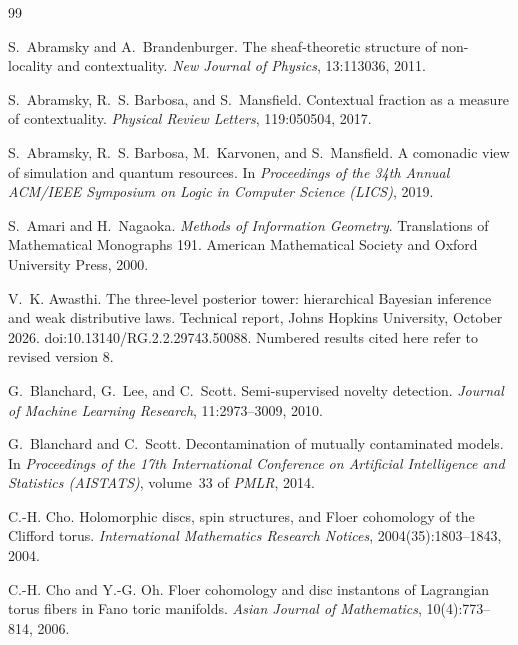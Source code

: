 \documentclass[11pt]{article}
\theoremstyle{definition}
\theoremstyle{remark}
\begin{document}
\begin{thebibliography}{99}

S.~Abramsky and A.~Brandenburger.
\newblock The sheaf-theoretic structure of non-locality and contextuality.
\newblock \emph{New Journal of Physics}, 13:113036, 2011.

S.~Abramsky, R.~S. Barbosa, and S.~Mansfield.
\newblock Contextual fraction as a measure of contextuality.
\newblock \emph{Physical Review Letters}, 119:050504, 2017.

S.~Abramsky, R.~S. Barbosa, M.~Karvonen, and S.~Mansfield.
\newblock A comonadic view of simulation and quantum resources.
\newblock In \emph{Proceedings of the 34th Annual ACM/IEEE Symposium on Logic in Computer Science
  (LICS)}, 2019.

S.~Amari and H.~Nagaoka.
\newblock \emph{Methods of Information Geometry}.
\newblock Translations of Mathematical Monographs 191. American Mathematical Society and Oxford
University Press, 2000.

V.~K. Awasthi.
\newblock The three-level posterior tower: hierarchical Bayesian inference and weak distributive laws.
\newblock Technical report, Johns Hopkins University, October 2026.
\newblock doi:10.13140/RG.2.2.29743.50088. Numbered results cited here refer to revised version 8.

G.~Blanchard, G.~Lee, and C.~Scott.
\newblock Semi-supervised novelty detection.
\newblock \emph{Journal of Machine Learning Research}, 11:2973--3009, 2010.

G.~Blanchard and C.~Scott.
\newblock Decontamination of mutually contaminated models.
\newblock In \emph{Proceedings of the 17th International Conference on Artificial Intelligence and
  Statistics (AISTATS)}, volume~33 of \emph{PMLR}, 2014.

C.-H. Cho.
\newblock Holomorphic discs, spin structures, and {F}loer cohomology of the {C}lifford torus.
\newblock \emph{International Mathematics Research Notices}, 2004(35):1803--1843, 2004.

C.-H. Cho and Y.-G. Oh.
\newblock Floer cohomology and disc instantons of {L}agrangian torus fibers in {F}ano toric manifolds.
\newblock \emph{Asian Journal of Mathematics}, 10(4):773--814, 2006.


\end{thebibliography}
\end{document}
